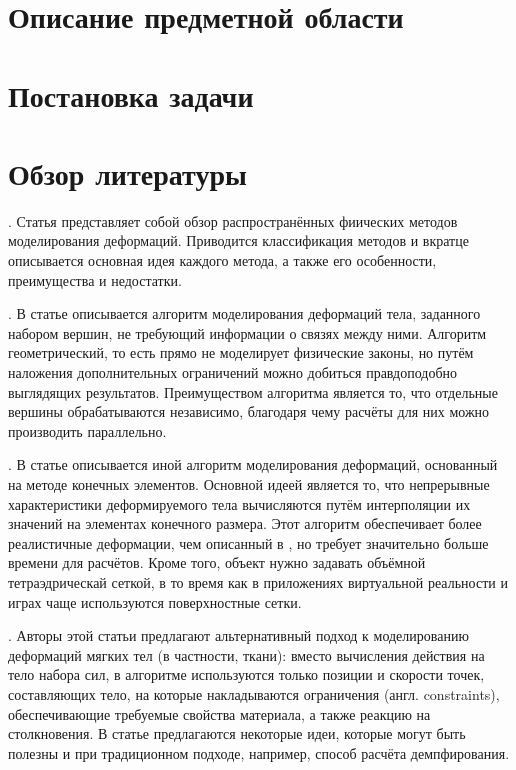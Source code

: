 \documentclass[a4paper,11pt]{report}
\begin{document}
  \chapter{Описание предметной области}
  \chapter{Постановка задачи}
  \chapter{Обзор литературы}

    \cite[Physically Based Deformable Models...]{muller-physmodels}. Статья представляет собой
      обзор распространённых фиических методов моделирования деформаций. Приводится классификация
      методов и вкратце описывается основная идея каждого метода, а также его особенности,
      преимущества и недостатки.

    \cite[Meshless Deformations...]{muller-meshless}. В статье описывается алгоритм
      моделирования деформаций тела, заданного набором вершин, не требующий информации о связях
      между ними. Алгоритм геометрический, то есть прямо не моделирует физические законы, но путём
      наложения дополнительных ограничений можно добиться правдоподобно выглядящих результатов.
      Преимуществом алгоритма является то, что отдельные вершины обрабатываются независимо,
      благодаря чему расчёты для них можно производить параллельно.

    \cite[Stable Real-Time Deformations]{muller-stable}. В статье описывается иной алгоритм
      моделирования деформаций, основанный на методе конечных элементов. Основной идеей является то,
      что непрерывные характеристики деформируемого тела вычисляются путём интерполяции их значений
      на элементах конечного размера. Этот алгоритм обеспечивает более реалистичные деформации, чем
      описанный в \cite{muller-meshless}, но требует значительно больше времени для расчётов. Кроме
      того, объект нужно задавать объёмной тетраэдрическай сеткой, в то время как в приложениях
      виртуальной реальности и играх чаще используются поверхностные сетки.

    \cite[Position Based Dynamics]{muller-position-dynamics}. Авторы этой статьи предлагают
      альтернативный подход к моделированию деформаций мягких тел (в частности, ткани): вместо
      вычисления действия на тело набора сил, в алгоритме используются только позиции и скорости
      точек, составляющих тело, на которые накладываются ограничения (англ. {\English constraints}),
      обеспечивающие требуемые свойства материала, а также реакцию на столкновения. В статье
      предлагаются некоторые идеи, которые могут быть полезны и при традиционном подходе, например,
      способ расчёта демпфирования.
\end{document}

